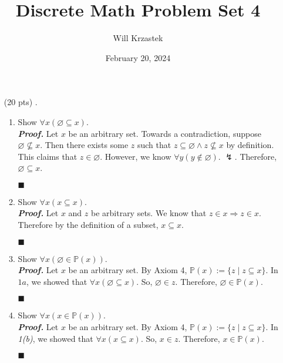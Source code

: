 \documentclass[11pt,a4paper]{article}
\begin{document}
 
\title{Discrete Math Problem Set 4}
\author{Will Krzastek}
\date{February 20, 2024}
\maketitle

\begin{enumerate}
    \item[(20 pts) \quad 1.]
    \begin{enumerate}
        \item 
        Show $\forall x (\varnothing \subseteq x)$. \\
        \emph{\textbf{Proof.}} Let $x$ be an arbitrary set. Towards a contradiction, suppose $\varnothing \nsubseteq x$. 
        Then there exists some $z$ such that $z \subseteq \varnothing \land z \nsubseteq x$ by definition. This claims that $z \in \varnothing$.
        However, we know $\forall y(y \notin \varnothing)$. $\lightning$. Therefore, $\varnothing \subseteq x$.
        \begin{flushright}
            $\blacksquare$
        \end{flushright}
        
        \item 
        Show $\forall x (x \subseteq x)$. \\
        \emph{\textbf{Proof.}} Let $x$ and $z$ be arbitrary sets. We know that $z \in x \Rightarrow z \in x$. Therefore by the definition of a subset, $x \subseteq x$. 
        \begin{flushright}
            $\blacksquare$
        \end{flushright}

        \item 
        Show $\forall x (\varnothing \in \mathbb{P} (x))$. \\
        \emph{\textbf{Proof.}} Let $x$ be an arbitrary set. By Axiom 4, $\mathbb{P} (x) := \{z \mid z \subseteq x\}$. In \emph{$1a$}, we showed that $\forall x (\varnothing \subseteq x)$. 
        So, $\varnothing \in z$. Therefore, $\varnothing \in \mathbb{P} (x)$.
        \begin{flushright}
            $\blacksquare$
        \end{flushright}

        \item 
        Show $\forall x (x \in \mathbb{P} (x))$. \\
        \emph{\textbf{Proof.}} Let $x$ be an arbitrary set. By Axiom 4, $\mathbb{P} (x) := \{z \mid z \subseteq x\}$. In \emph{1(b)}, we showed that $\forall x (x \subseteq x)$. So, $x \in z$. Therefore, $x \in \mathbb{P} (x)$.
        \begin{flushright}
            $\blacksquare$
        \end{flushright}


\end{enumerate}
\end{enumerate}
\end{document}
